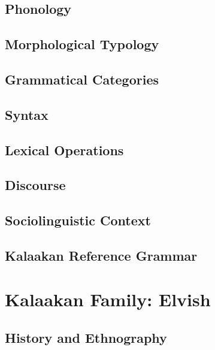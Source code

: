 \documentclass[12pt,letterpaper,openany,twoside]{memoir}
\let\originalpart=\part
\def\part{\cleardoublepage\originalpart}
\begin{document}
\chapter{Phonology}

\chapter{Morphological Typology}

\chapter{Grammatical Categories}

\chapter{Syntax}

\chapter{Lexical Operations}

\chapter{Discourse}

\chapter{Sociolinguistic Context}

\chapter{Kalaakan Reference Grammar}

\part{Kalaakan Family: Elvish}

\chapter{History and Ethnography}
\end{document}

